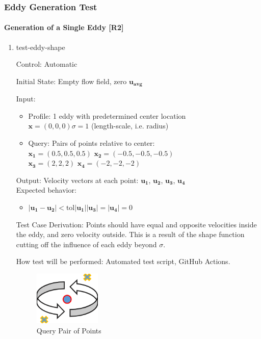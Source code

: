 \documentclass[12pt, titlepage]{article}
\begin{document}
\newpage
\subsubsection{Eddy Generation Test} \label{ST:EddyGen}
\paragraph{Generation of a Single Eddy [R2]}

\begin{enumerate}

  \item{test-eddy-shape\\}

  Control: Automatic
            
  Initial State: Empty flow field, zero $\mathbf{u_{avg}}$
            
  Input:
  \begin{itemize}
    \item Profile: 1 eddy with predetermined center location\\
    $\mathbf{x}=(0,0,0)$\tab$\sigma=1$ (length-scale, i.e. radius) 
    \item Query: Pairs of points relative to center:\\
    $\mathbf{x_1}=(0.5,0.5,0.5)$ \tab$\mathbf{x_2}=(-0.5,-0.5,-0.5)$\\
    $\mathbf{x_3}=(2,2,2)$ \tab$\mathbf{x_4}=(-2,-2,-2)$
  \end{itemize}
  Output: Velocity vectors at each point: $\mathbf{u_1}$, $\mathbf{u_2}$, $\mathbf{u_3}$, $\mathbf{u_4}$\\
  Expected behavior:
  \begin{itemize}
    \item $|\mathbf{u_1} -\mathbf{u_2}| <\text{tol}|\mathbf{u_1}|$\tab $|\mathbf{u_3}| = |\mathbf{u_4}|=0$
  \end{itemize}

  Test Case Derivation: Points should have equal and opposite velocities inside the eddy, and zero velocity outside. This is a result of the shape function cutting off the influence of each eddy beyond $\sigma$.
            
  How test will be performed: Automated test script, GitHub Actions.

  \begin{figure}[h!]
    \begin{center}
    \includegraphics[width=0.3\textwidth]{eddy-shape.png}
    \caption{Query Pair of Points}
    \label{Fig_EddyShape} 
    \end{center}
  \end{figure}


\end{enumerate}
\end{document}
